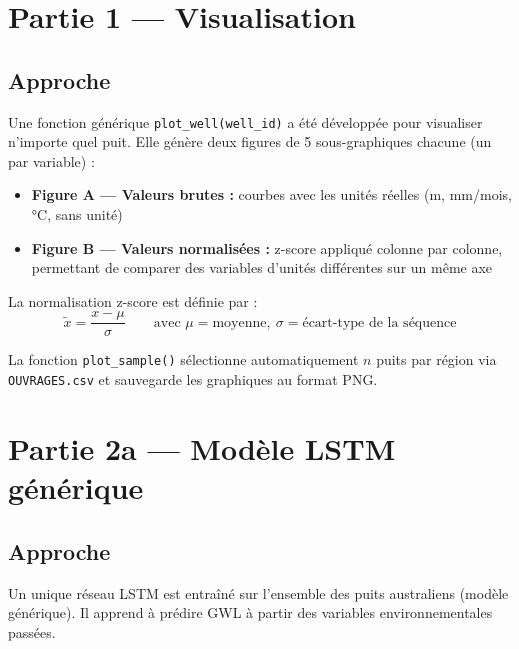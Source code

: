 \documentclass[11pt, a4paper]{article}
\begin{document}
\section{Partie 1 — Visualisation}

\subsection{Approche}

Une fonction générique \texttt{plot\_well(well\_id)} a été développée pour visualiser
n'importe quel puit. Elle génère deux figures de 5 sous-graphiques chacune (un par variable) :

\begin{itemize}
  \setlength\itemsep{2pt}
  \item \textbf{Figure A — Valeurs brutes :} courbes avec les unités réelles
        (m, mm/mois, °C, sans unité)
  \item \textbf{Figure B — Valeurs normalisées :} z-score appliqué colonne par colonne,
        permettant de comparer des variables d'unités différentes sur un même axe
\end{itemize}

La normalisation z-score est définie par :
\[
  \tilde{x} = \frac{x - \mu}{\sigma}
  \qquad \text{avec } \mu = \text{moyenne},\ \sigma = \text{écart-type de la séquence}
\]

La fonction \texttt{plot\_sample()} sélectionne automatiquement $n$ puits par région
via \texttt{OUVRAGES.csv} et sauvegarde les graphiques au format PNG.

\section{Partie 2a — Modèle LSTM générique}

\subsection{Approche}

Un unique réseau LSTM est entraîné sur l'ensemble des puits australiens (modèle générique).
Il apprend à prédire GWL à partir des variables environnementales passées.
\end{document}
